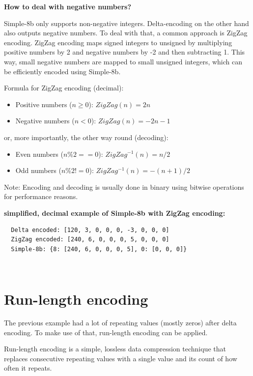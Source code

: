 \textbf{How to deal with negative numbers?}

Simple-8b only supports non-negative integers. Delta-encoding on the other hand
also outputs negative numbers. To deal with that, a common approach is ZigZag
encoding. ZigZag encoding maps signed integers to unsigned by multiplying
positive numbers by 2 and negative numbers by -2 and then subtracting 1. This
way, small negative numbers are mapped to small unsigned integers, which can be
efficiently encoded using Simple-8b.

Formula for ZigZag encoding (decimal):

\begin{itemize}
  \item Positive numbers ($n \geq 0$): $ZigZag(n) = 2n$
  \item Negative numbers ($n < 0$): $ZigZag(n) = -2n - 1$
\end{itemize}

or, more importantly, the other way round (decoding):

\begin{itemize}
  \item Even numbers ($n \% 2 == 0$): $ZigZag^{-1}(n) = n / 2$
  \item Odd numbers ($n \% 2 != 0$): $ZigZag^{-1}(n) = -(n + 1) / 2$
\end{itemize}

Note: Encoding and decoding is usually done in binary using bitwise operations
for performance reasons.

\textbf{simplified, decimal example of Simple-8b with ZigZag encoding:}

\begin{verbatim}
  Delta encoded: [120, 3, 0, 0, 0, -3, 0, 0, 0]
  ZigZag encoded: [240, 6, 0, 0, 0, 5, 0, 0, 0]
  Simple-8b: {8: [240, 6, 0, 0, 0, 5], 0: [0, 0, 0]}
\end{verbatim}

~\cite{ZigZag:01}

\section{Run-length encoding}\label{sec:run-length-encoding}

The previous example had a lot of repeating values (mostly zeros) after delta
encoding. To make use of that, run-length encoding can be applied.

Run-length encoding is a simple, lossless data compression technique that
replaces consecutive repeating values with a single value and its count of how
often it repeats.

